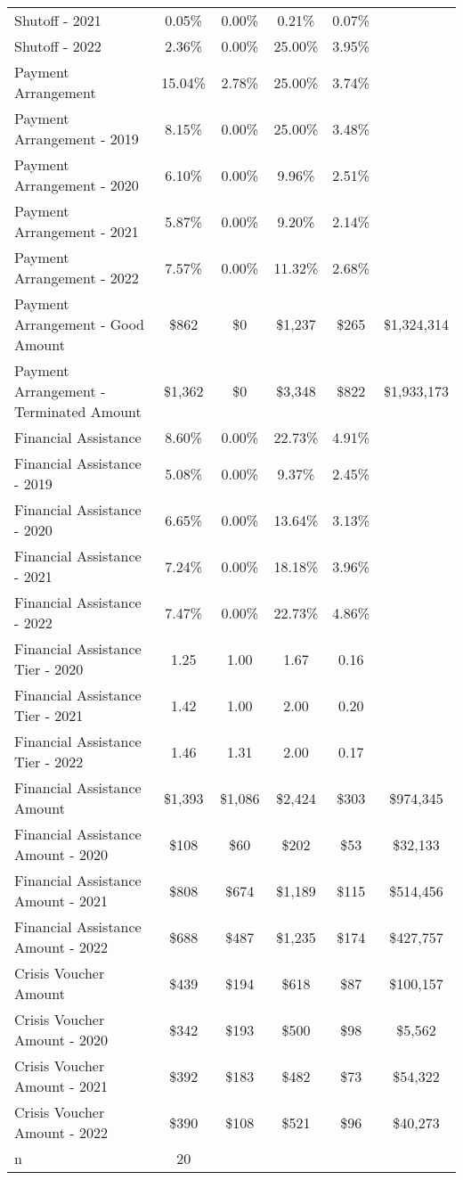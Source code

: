 \begin{tabular}{l|c|c|c|c|c}
\quad Shutoff - 2021 & 0.05\% & 0.00\% & 0.21\% & 0.07\% \\
\quad Shutoff - 2022 & 2.36\% & 0.00\% & 25.00\% & 3.95\% \\
\midrule 
Payment Arrangement & 15.04\% & 2.78\% & 25.00\% & 3.74\% \\
\quad Payment Arrangement - 2019 & 8.15\% & 0.00\% & 25.00\% & 3.48\% \\
\quad Payment Arrangement - 2020 & 6.10\% & 0.00\% & 9.96\% & 2.51\% \\
\quad Payment Arrangement - 2021 & 5.87\% & 0.00\% & 9.20\% & 2.14\% \\
\quad Payment Arrangement - 2022 & 7.57\% & 0.00\% & 11.32\% & 2.68\% \\
\quad Payment Arrangement - Good Amount & \$862 & \$0 & \$1,237 & \$265 & \$1,324,314 \\
\quad Payment Arrangement - Terminated Amount & \$1,362 & \$0 & \$3,348 & \$822 & \$1,933,173 \\
\midrule 
Financial Assistance & 8.60\% & 0.00\% & 22.73\% & 4.91\% \\
\quad Financial Assistance - 2019 & 5.08\% & 0.00\% & 9.37\% & 2.45\% \\
\quad Financial Assistance - 2020 & 6.65\% & 0.00\% & 13.64\% & 3.13\% \\
\quad Financial Assistance - 2021 & 7.24\% & 0.00\% & 18.18\% & 3.96\% \\
\quad Financial Assistance - 2022 & 7.47\% & 0.00\% & 22.73\% & 4.86\% \\
\midrule 
Financial Assistance Tier - 2020 & 1.25 & 1.00 & 1.67 & 0.16 \\
Financial Assistance Tier - 2021 & 1.42 & 1.00 & 2.00 & 0.20 \\
Financial Assistance Tier - 2022 & 1.46 & 1.31 & 2.00 & 0.17 \\
\midrule 
Financial Assistance Amount & \$1,393 & \$1,086 & \$2,424 & \$303 & \$974,345 \\
\quad Financial Assistance Amount - 2020 & \$108 & \$60 & \$202 & \$53 & \$32,133 \\
\quad Financial Assistance Amount - 2021 & \$808 & \$674 & \$1,189 & \$115 & \$514,456 \\
\quad Financial Assistance Amount - 2022 & \$688 & \$487 & \$1,235 & \$174 & \$427,757 \\
\midrule 
Crisis Voucher Amount & \$439 & \$194 & \$618 & \$87 & \$100,157 \\
\quad Crisis Voucher Amount - 2020 & \$342 & \$193 & \$500 & \$98 & \$5,562 \\
\quad Crisis Voucher Amount - 2021 & \$392 & \$183 & \$482 & \$73 & \$54,322 \\
\quad Crisis Voucher Amount - 2022 & \$390 & \$108 & \$521 & \$96 & \$40,273 \\
\midrule 
n & 20 &  &  &  &  \\
\midrule 
\bottomrule 
\end{tabular}
